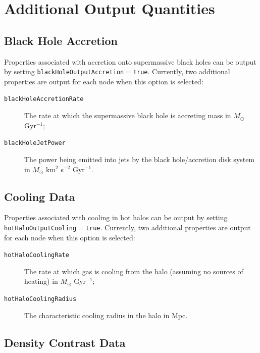\chapter{Additional Output Quantities}

\section{Black Hole Accretion}

Properties associated with accretion onto supermassive black holes can be output by setting {\tt blackHoleOutputAccretion}$=${\tt true}. Currently, two additional properties are output for each node when this option is selected:
\begin{description}
\item[{\tt blackHoleAccretionRate}] The rate at which the supermassive black hole is accreting mass in $M_\odot$ Gyr$^{-1}$;
\item[{\tt blackHoleJetPower}] The power being emitted into jets by the black hole/accretion disk system in $M_\odot$ km$^2$ s$^{-2}$ Gyr$^{-1}$.
\end{description}

\section{Cooling Data}

Properties associated with cooling in hot halos can be output by setting {\tt hotHaloOutputCooling}$=${\tt true}. Currently, two additional properties are output for each node when this option is selected:
\begin{description}
\item[{\tt hotHaloCoolingRate}] The rate at which gas is cooling from the halo (assuming no sources of heating) in $M_\odot$ Gyr$^{-1}$;
\item[{\tt hotHaloCoolingRadius}] The characteristic cooling radius in the halo in Mpc.
\end{description}

\section{Density Contrast Data}


